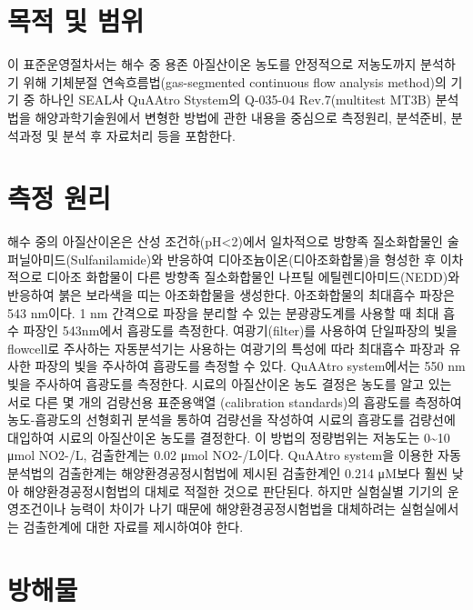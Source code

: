 \documentclass[
]{book}
\begin{document}
\hypertarget{uxbaa9uxc801-uxbc0f-uxbc94uxc704}{%
\section{목적 및 범위}\label{uxbaa9uxc801-uxbc0f-uxbc94uxc704}}

이 표준운영절차서는 해수 중 용존 아질산이온 농도를 안정적으로 저농도까지 분석하기 위해 기체분절 연속흐름법(gas-segmented continuous flow analysis method)의 기기 중 하나인 SEAL사 QuAAtro Stystem의 Q-035-04 Rev.7(multitest MT3B) 분석법을 해양과학기술원에서 변형한 방법에 관한 내용을 중심으로 측정원리, 분석준비, 분석과정 및 분석 후 자료처리 등을 포함한다.

\hypertarget{uxce21uxc815-uxc6d0uxb9ac}{%
\section{측정 원리}\label{uxce21uxc815-uxc6d0uxb9ac}}

해수 중의 아질산이온은 산성 조건하(pH\textless2)에서 일차적으로 방향족 질소화합물인 술퍼닐아미드(Sulfanilamide)와 반응하여 디아조늄이온(디아조화합물)을 형성한 후 이차적으로 디아조 화합물이 다른 방향족 질소화합물인 나프틸 에틸렌디아미드(NEDD)와 반응하여 붉은 보라색을 띠는 아조화합물을 생성한다. 아조화합물의 최대흡수 파장은 543 nm이다.
1 nm 간격으로 파장을 분리할 수 있는 분광광도계를 사용할 때 최대 흡수 파장인 543nm에서 흡광도를 측정한다. 여광기(filter)를 사용하여 단일파장의 빛을 flowcell로 주사하는 자동분석기는 사용하는 여광기의 특성에 따라 최대흡수 파장과 유사한 파장의 빛을 주사하여 흡광도를 측정할 수 있다. QuAAtro system에서는 550 nm 빛을 주사하여 흡광도를 측정한다.
시료의 아질산이온 농도 결정은 농도를 알고 있는 서로 다른 몇 개의 검량선용 표준용액열 (calibration standards)의 흡광도를 측정하여 농도-흡광도의 선형회귀 분석을 통하여 검량선을 작성하여 시료의 흡광도를 검량선에 대입하여 시료의 아질산이온 농도를 결정한다.
이 방법의 정량범위는 저농도는 0\textasciitilde10 μmol NO2-/L, 검출한계는 0.02 μmol NO2-/L이다. QuAAtro system을 이용한 자동분석법의 검출한계는 해양환경공정시험법에 제시된 검출한계인 0.214 μM보다 훨씬 낮아 해양환경공정시험법의 대체로 적절한 것으로 판단된다. 하지만 실험실별 기기의 운영조건이나 능력이 차이가 나기 때문에 해양환경공정시험법을 대체하려는 실험실에서는 검출한계에 대한 자료를 제시하여야 한다.

\hypertarget{uxbc29uxd574uxbb3c}{%
\section{방해물}\label{uxbc29uxd574uxbb3c}}
\end{document}
